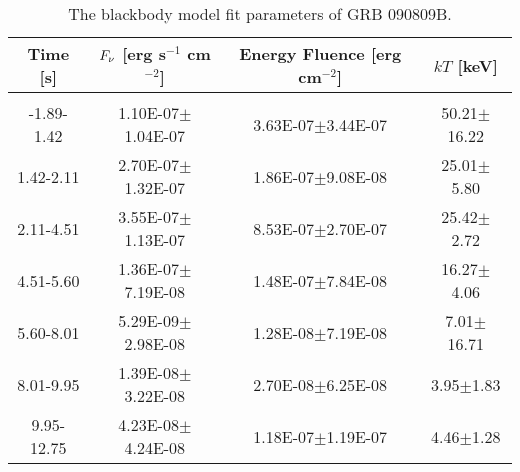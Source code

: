 \begin{table}[h]
\centering
\scriptsize
\label{tab:}
\begin{tabular}{c| c c c}
Time [s] & $F_{\nu}$ [erg s$^{-1}$ cm$^{-2}$] & Energy Fluence [erg cm$^{-2}$] & $kT$ [keV] \\
\hline \hline\\ 

-1.89-1.42 & 1.10E-07$\pm$1.04E-07 & 3.63E-07$\pm$3.44E-07 & 50.21$\pm$16.22 \\ 

1.42-2.11 & 2.70E-07$\pm$1.32E-07 & 1.86E-07$\pm$9.08E-08 & 25.01$\pm$5.80 \\ 

2.11-4.51 & 3.55E-07$\pm$1.13E-07 & 8.53E-07$\pm$2.70E-07 & 25.42$\pm$2.72 \\ 

4.51-5.60 & 1.36E-07$\pm$7.19E-08 & 1.48E-07$\pm$7.84E-08 & 16.27$\pm$4.06 \\ 

5.60-8.01 & 5.29E-09$\pm$2.98E-08 & 1.28E-08$\pm$7.19E-08 & 7.01$\pm$16.71 \\ 

8.01-9.95 & 1.39E-08$\pm$3.22E-08 & 2.70E-08$\pm$6.25E-08 & 3.95$\pm$1.83 \\ 

9.95-12.75 & 4.23E-08$\pm$4.24E-08 & 1.18E-07$\pm$1.19E-07 & 4.46$\pm$1.28 \\ 

\end{tabular}
\caption{The blackbody model fit parameters of GRB 090809B.}
\end{table}

